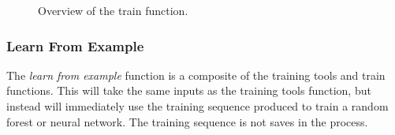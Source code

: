 \documentclass[12pt,twoside,notitlepage]{report}
\begin{document}
\begin{figure}[H]
{\begin{tikzpicture}[node distance=2cm,>=stealth',bend angle=45,auto]
                                    
                            \end{tikzpicture}
                        }

                    \caption{Overview of the train function.}
                \end{figure} 



            \subsubsection{Learn From Example}
                The \textit{learn from example} function is a composite of the training tools and train functions. This will 
                take the same inputs as the training tools function, but instead will immediately use the training 
                sequence produced to train a random forest or neural network. The training sequence is not saves in the 
                process. 
\end{document}

